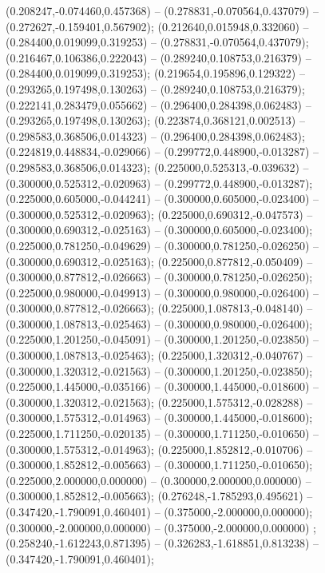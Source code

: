  (0.208247,-0.074460,0.457368) -- (0.278831,-0.070564,0.437079) -- (0.272627,-0.159401,0.567902);
 (0.212640,0.015948,0.332060) -- (0.284400,0.019099,0.319253) -- (0.278831,-0.070564,0.437079);
 (0.216467,0.106386,0.222043) -- (0.289240,0.108753,0.216379) -- (0.284400,0.019099,0.319253);
 (0.219654,0.195896,0.129322) -- (0.293265,0.197498,0.130263) -- (0.289240,0.108753,0.216379);
 (0.222141,0.283479,0.055662) -- (0.296400,0.284398,0.062483) -- (0.293265,0.197498,0.130263);
 (0.223874,0.368121,0.002513) -- (0.298583,0.368506,0.014323) -- (0.296400,0.284398,0.062483);
 (0.224819,0.448834,-0.029066) -- (0.299772,0.448900,-0.013287) -- (0.298583,0.368506,0.014323);
 (0.225000,0.525313,-0.039632) -- (0.300000,0.525312,-0.020963) -- (0.299772,0.448900,-0.013287);
 (0.225000,0.605000,-0.044241) -- (0.300000,0.605000,-0.023400) -- (0.300000,0.525312,-0.020963);
 (0.225000,0.690312,-0.047573) -- (0.300000,0.690312,-0.025163) -- (0.300000,0.605000,-0.023400);
 (0.225000,0.781250,-0.049629) -- (0.300000,0.781250,-0.026250) -- (0.300000,0.690312,-0.025163);
 (0.225000,0.877812,-0.050409) -- (0.300000,0.877812,-0.026663) -- (0.300000,0.781250,-0.026250);
 (0.225000,0.980000,-0.049913) -- (0.300000,0.980000,-0.026400) -- (0.300000,0.877812,-0.026663);
 (0.225000,1.087813,-0.048140) -- (0.300000,1.087813,-0.025463) -- (0.300000,0.980000,-0.026400);
 (0.225000,1.201250,-0.045091) -- (0.300000,1.201250,-0.023850) -- (0.300000,1.087813,-0.025463);
 (0.225000,1.320312,-0.040767) -- (0.300000,1.320312,-0.021563) -- (0.300000,1.201250,-0.023850);
 (0.225000,1.445000,-0.035166) -- (0.300000,1.445000,-0.018600) -- (0.300000,1.320312,-0.021563);
 (0.225000,1.575312,-0.028288) -- (0.300000,1.575312,-0.014963) -- (0.300000,1.445000,-0.018600);
 (0.225000,1.711250,-0.020135) -- (0.300000,1.711250,-0.010650) -- (0.300000,1.575312,-0.014963);
 (0.225000,1.852812,-0.010706) -- (0.300000,1.852812,-0.005663) -- (0.300000,1.711250,-0.010650);
 (0.225000,2.000000,0.000000) -- (0.300000,2.000000,0.000000) -- (0.300000,1.852812,-0.005663);
 (0.276248,-1.785293,0.495621) -- (0.347420,-1.790091,0.460401) -- (0.375000,-2.000000,0.000000);
 (0.300000,-2.000000,0.000000) -- (0.375000,-2.000000,0.000000) ;
 (0.258240,-1.612243,0.871395) -- (0.326283,-1.618851,0.813238) -- (0.347420,-1.790091,0.460401);

